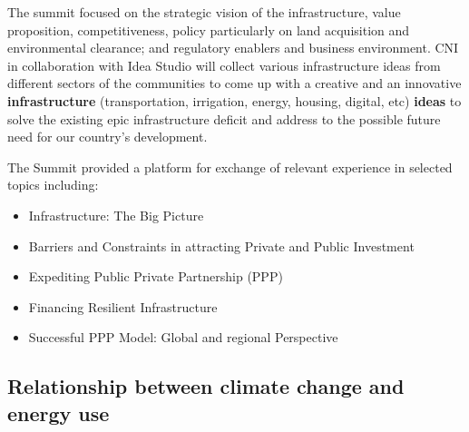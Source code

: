 \documentclass[
  openany]{book}
\providecommand{\tightlist}{%
  \setlength{\itemsep}{0pt}\setlength{\parskip}{0pt}}
\begin{document}
The summit focused on the strategic vision of the infrastructure, value proposition, competitiveness, policy particularly on land acquisition and environmental clearance; and regulatory enablers and business environment. CNI in collaboration with Idea Studio will collect various infrastructure ideas from different sectors of the communities to come up with a creative and an innovative \textbf{infrastructure} (transportation, irrigation, energy, housing, digital, etc) \textbf{ideas} to solve the existing epic infrastructure deficit and address to the possible future need for our country's development.

The Summit provided a platform for exchange of relevant experience in selected topics including:

\begin{itemize}
\tightlist
\item
  Infrastructure: The Big Picture
\item
  Barriers and Constraints in attracting Private and Public Investment
\item
  Expediting Public Private Partnership (PPP)
\item
  Financing Resilient Infrastructure
\item
  Successful PPP Model: Global and regional Perspective
\end{itemize}

\hypertarget{relationship-between-climate-change-and-energy-use}{%
\subsection{Relationship between climate change and energy use}\label{relationship-between-climate-change-and-energy-use}}
\end{document}
